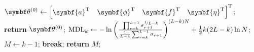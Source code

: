 \begin{algorithm}
\begin{algorithmic}[1]
            \EndIf
            \State $\bthzero \gets
                \begin{bmatrix}
                    \symbf{a}\T &
                    \symbf{\phi}\T &
                    \symbf{f}\T &
                    \symbf{\eta}\T
                \end{bmatrix}\T
            $;
            \State \textbf{return} $\bthzero$;
        \EndProcedure
        \Statex
        \label{state:mdl}
                \State $\operatorname{MDL}_k \gets
                -\ln\left(
                    \frac
                    {\prod_{r=k}^{L-1} \sigma_{r+1}^{\nicefrac{1}{L-k}}}
                    {\frac{1}{L-k} \sum_{r=k}^{L-1} \sigma_{r+1}}
                \right)^{(L-k)N}
                + \frac{1}{2}k(2L - k)\ln N
                $;
                    \State $M \gets k-1$;
                    \State \textbf{break};
                \EndIf
            \EndFor
            \State \textbf{return} $M$;
        \EndProcedure
    \end{algorithmic}
\end{algorithm}


